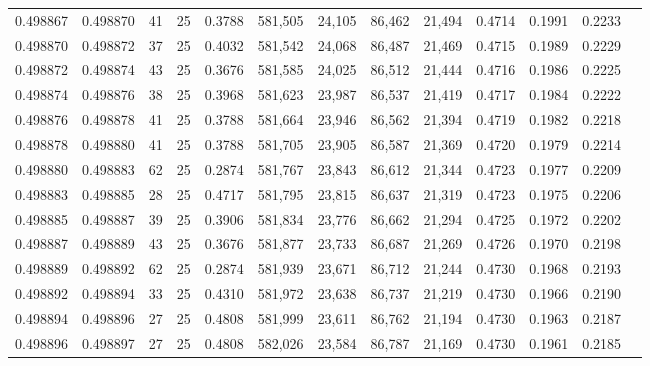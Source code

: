 \begin{tabular}{rrrrrrrrrrrrr}
0.498867 & 0.498870 &    41 &  25 &                                     0.3788 & 581,505 &  24,105 &  86,462 &  21,494 & 0.4714 & 0.1991 & 0.2233 \\
0.498870 & 0.498872 &    37 &  25 &                                     0.4032 & 581,542 &  24,068 &  86,487 &  21,469 & 0.4715 & 0.1989 & 0.2229 \\
0.498872 & 0.498874 &    43 &  25 &                                     0.3676 & 581,585 &  24,025 &  86,512 &  21,444 & 0.4716 & 0.1986 & 0.2225 \\
0.498874 & 0.498876 &    38 &  25 &                                     0.3968 & 581,623 &  23,987 &  86,537 &  21,419 & 0.4717 & 0.1984 & 0.2222 \\
0.498876 & 0.498878 &    41 &  25 &                                     0.3788 & 581,664 &  23,946 &  86,562 &  21,394 & 0.4719 & 0.1982 & 0.2218 \\
0.498878 & 0.498880 &    41 &  25 &                                     0.3788 & 581,705 &  23,905 &  86,587 &  21,369 & 0.4720 & 0.1979 & 0.2214 \\
0.498880 & 0.498883 &    62 &  25 &                                     0.2874 & 581,767 &  23,843 &  86,612 &  21,344 & 0.4723 & 0.1977 & 0.2209 \\
0.498883 & 0.498885 &    28 &  25 &                                     0.4717 & 581,795 &  23,815 &  86,637 &  21,319 & 0.4723 & 0.1975 & 0.2206 \\
0.498885 & 0.498887 &    39 &  25 &                                     0.3906 & 581,834 &  23,776 &  86,662 &  21,294 & 0.4725 & 0.1972 & 0.2202 \\
0.498887 & 0.498889 &    43 &  25 &                                     0.3676 & 581,877 &  23,733 &  86,687 &  21,269 & 0.4726 & 0.1970 & 0.2198 \\
0.498889 & 0.498892 &    62 &  25 &                                     0.2874 & 581,939 &  23,671 &  86,712 &  21,244 & 0.4730 & 0.1968 & 0.2193 \\
0.498892 & 0.498894 &    33 &  25 &                                     0.4310 & 581,972 &  23,638 &  86,737 &  21,219 & 0.4730 & 0.1966 & 0.2190 \\
0.498894 & 0.498896 &    27 &  25 &                                     0.4808 & 581,999 &  23,611 &  86,762 &  21,194 & 0.4730 & 0.1963 & 0.2187 \\
0.498896 & 0.498897 &    27 &  25 &                                     0.4808 & 582,026 &  23,584 &  86,787 &  21,169 & 0.4730 & 0.1961 & 0.2185 \\

\end{tabular}
